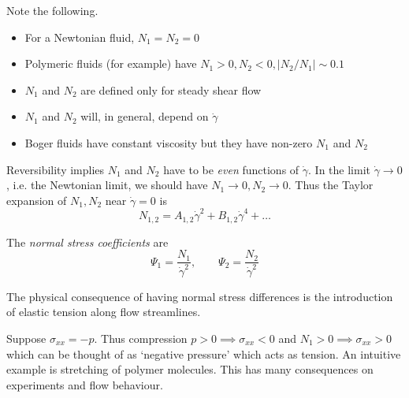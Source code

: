 \documentclass{jknotes}
\begin{document}
Note the following.
\begin{itemize}
	\item For a Newtonian fluid, $N_1 = N_2 = 0$
	\item Polymeric fluids (for example) have $N_1 > 0, N_2 < 0, \left|
		N_2/N_1 \right| \sim 0.1$
	\item $N_1$ and $N_2$ are defined only for steady shear flow
	\item $N_1$ and $N_2$ will, in general, depend on $\dot{\gamma}$
	\item Boger fluids have constant viscosity but they have non-zero $N_1$
		and $N_2$
\end{itemize}

Reversibility implies $N_1$ and $N_2$ have to be \emph{even} functions of
$\dot{\gamma}$. In the limit $\dot{\gamma} \to 0$, i.e. the Newtonian limit,
we should have $N_1 \to 0, N_2 \to 0$. Thus the Taylor expansion of $N_1, N_2$
near $\dot{\gamma} = 0$ is
\begin{equation}
	N_{1,2} = A_{1,2}\dot{\gamma}^2 + B_{1,2}\dot{\gamma}^4 + \dots
\end{equation}

\begin{defn}
	The \emph{normal stress coefficients} are
	\begin{equation}
		\Psi_1 = \frac{N_1}{\dot{\gamma}^2}, \hspace{2em} \Psi_2 =
		\frac{N_2}{\dot{\gamma}^2}
	\end{equation}
\end{defn}

The physical consequence of having normal stress differences is the
introduction of elastic tension along flow streamlines.

Suppose $\sigma_{xx} = -p$. Thus compression $p > 0 \implies \sigma_{xx} < 0$
and $N_1 > 0 \implies \sigma_{xx} > 0$ which can be thought of as `negative
pressure' which acts as tension. An intuitive example is stretching of polymer
molecules. This has many consequences on experiments and flow behaviour.
\end{document}

